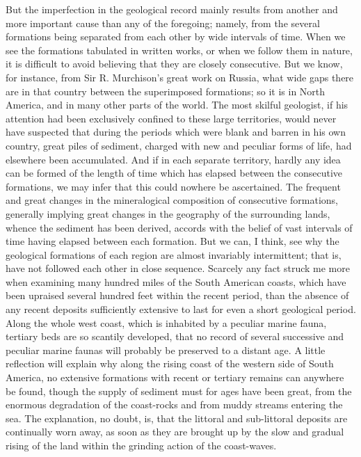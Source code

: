 But the imperfection in the geological record mainly results from another and more important cause than any of the foregoing; namely, from the several formations being separated from each other by wide intervals of time. When we see the formations tabulated in written works, or when we follow them in nature, it is difficult to avoid believing that they are closely consecutive. But we know, for instance, from Sir R. Murchison's great work on Russia, what wide gaps there are in that country between the superimposed formations; so it is in North America, and in many other parts of the world. The most skilful geologist, if his attention had been exclusively confined to these large territories, would never have suspected that during the periods which were blank and barren in his own country, great piles of sediment, charged with new and peculiar forms of life, had elsewhere been accumulated. And if in each separate territory, hardly any idea can be formed of the length of time which has elapsed between the consecutive formations, we may infer that this could nowhere be ascertained. The frequent and great changes in the mineralogical composition of consecutive formations, generally implying great changes in the geography of the surrounding lands, whence the sediment has been derived, accords with the belief of vast intervals of time having elapsed between each formation.
But we can, I think, see why the geological formations of each region are almost invariably intermittent; that is, have not followed each other in close sequence. Scarcely any fact struck me more when examining many hundred miles of the South American coasts, which have been upraised several hundred feet within the recent period, than the absence of any recent deposits sufficiently extensive to last for even a short geological period. Along the whole west coast, which is inhabited by a peculiar marine fauna, tertiary beds are so scantily developed, that no record of several successive and peculiar marine faunas will probably be preserved to a distant age. A little reflection will explain why along the rising coast of the western side of South America, no extensive formations with recent or tertiary remains can anywhere be found, though the supply of sediment must for ages have been great, from the enormous degradation of the coast-rocks and from muddy streams entering the sea. The explanation, no doubt, is, that the littoral and sub-littoral deposits are continually worn away, as soon as they are brought up by the slow and gradual rising of the land within the grinding action of the coast-waves.
